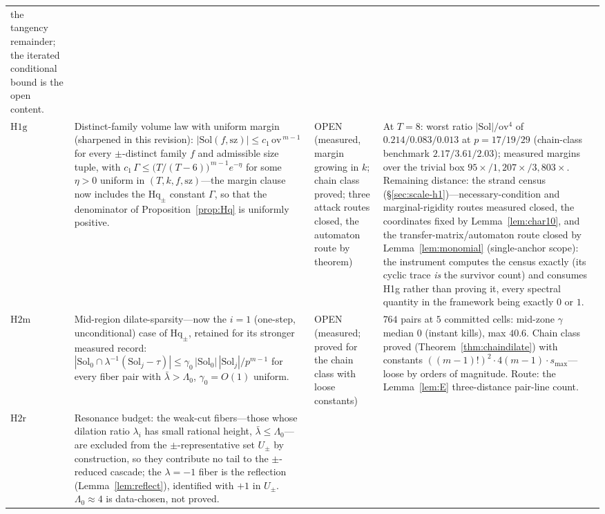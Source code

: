 {\begin{longtable}{@{}p{}p{}
                   p{}p{}@{}}
the tangency remainder; the iterated conditional bound is the open content. \\
$\mathrm{H1g}$ &
Distinct-family volume law with uniform margin (sharpened in this revision):
$|\mathrm{Sol}(f,\mathrm{sz})|\le c_1\,\mathrm{ov}^{\,m-1}$ for every
$\pm$-distinct family $f$ and admissible size tuple, with
$c_1\,\Gamma\le\bigl(T/(T-6)\bigr)^{\,m-1}e^{-\eta}$ for some $\eta>0$ uniform
in $(T,k,f,\mathrm{sz})$---the margin clause now includes the $\mathrm{Hq}_\pm$
constant $\Gamma$, so that the denominator of Proposition~\ref{prop:Hq} is
uniformly positive. &
OPEN (measured, margin growing in $k$; chain class proved; three
attack routes closed, the automaton route by theorem) &
At $T=8$: worst ratio $|\mathrm{Sol}|/\mathrm{ov}^4$ of
$0.214/0.083/0.013$ at $p=17/19/29$ (chain-class benchmark
$2.17/3.61/2.03$); measured margins over the trivial box
$95\times/1{,}207\times/3{,}803\times$. Remaining distance: the strand
census (\S\ref{sec:scale-h1})---necessary-condition and
marginal-rigidity routes measured closed, the coordinates fixed by
Lemma~\ref{lem:char10}, and the transfer-matrix/automaton route closed
by Lemma~\ref{lem:monomial} (single-anchor scope): the instrument computes
the census exactly (its cyclic trace \emph{is} the survivor count) and
consumes H1g rather than proving it, every spectral quantity in the
framework being exactly $0$ or $1$. \\
$\mathrm{H2m}$ &
Mid-region dilate-sparsity---now the $i=1$ (one-step, unconditional) case of
$\mathrm{Hq}_\pm$, retained for its stronger measured record:
$|\mathrm{Sol}_0\cap\lambda^{-1}(\mathrm{Sol}_j-\tau)|\le
\gamma_0\,|\mathrm{Sol}_0|\,|\mathrm{Sol}_j|/p^{m-1}$ for every fiber
pair with $\bar\lambda>\Lambda_0$, $\gamma_0=O(1)$ uniform. &
OPEN (measured; proved for the chain class with loose constants) &
$764$ pairs at $5$ committed cells: mid-zone $\gamma$ median $0$
(instant kills), max $40.6$. Chain class proved
(Theorem~\ref{thm:chaindilate}) with constants $((m-1)!)^2\cdot 4(m-1)\cdot
s_{\max}$---loose by orders of magnitude. Route: the
Lemma~\ref{lem:E} three-distance pair-line count. \\
$\mathrm{H2r}$ &
Resonance budget: the weak-cut fibers---those whose dilation ratio
$\lambda_i$ has small rational height, $\bar\lambda\le\Lambda_0$---are
excluded from the $\pm$-representative set $U_\pm$ by construction, so they
contribute no tail to the $\pm$-reduced cascade; the $\lambda=-1$ fiber is
the reflection (Lemma~\ref{lem:reflect}), identified with $+1$ in $U_\pm$.
$\Lambda_0\approx 4$ is data-chosen, not proved. &

\end{longtable}}
